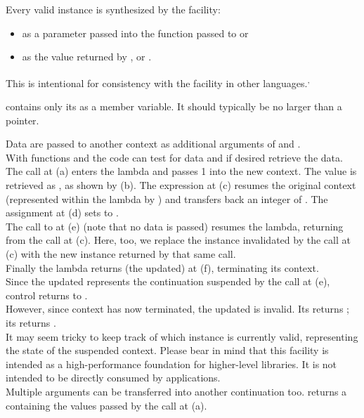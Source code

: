 \newpage
{}\label{design}


Every valid \cont instance is synthesized by the \callcc facility:
\begin{itemize}
\item as a parameter passed into the function passed to \callcc or \resumewith
\item as the value returned by \callcc, \resume or \resumewith.
\end{itemize}

This is intentional for consistency with the \cc facility in other
languages.\cite{schemecallcc}\textsuperscript{,}\cite{rubycallcc}


\cont contains only its  as a member variable. It should
typically be no larger than a pointer.

\label{subsec:data}

Data are passed to another context as additional arguments of \callcc and
\resume.\\
With functions \dataavail and \getdata the code can test for data and if desired
retrieve the data.
The  call at (a) enters the lambda and passes 1 into the
new context. The value is retrieved as , as shown by (b). The expression
 at (c) resumes the original context (represented
within the lambda by ) and transfers back an integer of .
The assignment at (d) sets  to .\\
The call to  at (e) (note that no data is passed) resumes the
lambda, returning from the  call at (c). Here, too,
we replace the \cont instance  invalidated by the \resume call at (c)
with the new instance returned by that same \resume call.\\
Finally the lambda returns (the updated)  at (f), terminating its
context.\\
Since the updated  represents the continuation suspended by the call at
(e), control returns to \main.\\
However, since context  has now terminated, the updated  is
invalid. Its \opbool returns ; its  returns
.\\
It may seem tricky to keep track of which \cont instance is currently valid,
representing the state of the suspended context. Please bear in mind that this
facility is intended as a high-performance foundation for higher-level
libraries. It is not intended to be directly consumed by applications.\\
Multiple arguments can be transferred into another continuation too.
 returns a 
containing the values passed by the \callcc call at (a).


